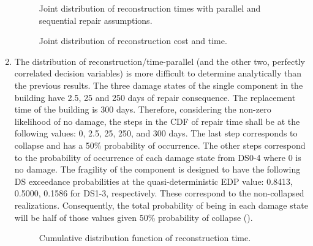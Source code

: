 \begin{enumerate}
\begin{figure}[!htbp]
  \caption{Joint distribution of reconstruction times with parallel and sequential repair assumptions.}
  \label{fig:ver_1_8}
\end{figure}

\begin{figure}[!htbp]
  \caption{Joint distribution of reconstruction cost and time.}
  \label{fig:ver_1_9}
\end{figure}

    \item The distribution of reconstruction/time-parallel (and the other two, perfectly correlated decision variables) is more difficult to determine analytically than the previous results. The three damage states of the single component in the building have 2.5, 25 and 250 days of repair consequence. The replacement time of the building is 300 days. Therefore, considering the non-zero likelihood of no damage, the steps in the CDF of repair time shall be at the following values: 0, 2.5, 25, 250, and 300 days. The last step corresponds to collapse and has a 50\% probability of occurrence. The other steps correspond to the probability of occurrence of each damage state from DS0-4 where 0 is no damage. The fragility of the component is designed to have the following DS exceedance probabilities at the quasi-deterministic EDP value: 0.8413, 0.5000, 0.1586 for DS1-3, respectively. These correspond to the non-collapsed realizations. Consequently, the total probability of being in each damage state will be half of those values given 50\% probability of collapse ().
    
\begin{figure}[!htbp]
  \caption{Cumulative distribution function of reconstruction time.}
  \label{fig:ver_1_10}
\end{figure}


\end{enumerate}
